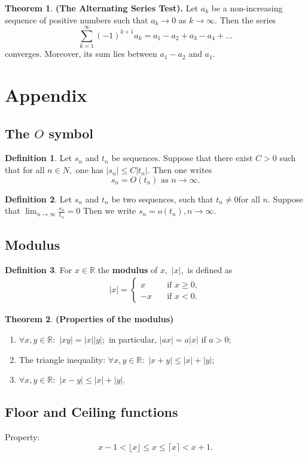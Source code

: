 \documentclass[12pt, a4paper]{article}
\newcommand{\bb}[1]{\mathbb{#1}}
\newcommand{\f}[2]{\frac{#1}{#2}}
\theoremstyle{definition}
\newtheorem{definition}{Definition}[section]
\newtheorem{theorem}{Theorem}[section]
\theoremstyle{plain}
\begin{document}
\begin{theorem}\textbf{(The Alternating Series Test).}
Let $a_k$ be a non-increasing sequence of positive numbers such that $a_k \to 0$ as $k \to \infty$. Then the series $$\sum_{k=1}^{\infty} (-1)^{k+1}a_k =a_1-a_2+a_3-a_4+\ldots$$ converges. Moreover, its sum lies between $a_1-a_2$ and $a_1.$
\end{theorem}

\pagebreak

\section{Appendix}

\subsection{The \texorpdfstring{$O$}{TEXT} symbol}

\begin{definition}
Let $s_n$ and $t_n$ be sequences. Suppose that there exist $C > 0$ such that for all $n \in N,$ one has $|s_n| \leq C|t_n|.$ Then one writes $$s_n=O(t_n) \text{ as } n\to \infty.$$
\end{definition}

\begin{definition}
Let $s_n$ and $t_n$ be two sequences, such that $t_n \neq 0$for all $n.$ Suppose that $\lim_{n\to \infty} \f{s_n}{t_n}=0$  Then we write $s_n =o(t_n),n\to\infty.$
\end{definition}

\subsection{Modulus}

\begin{definition}
For $x\in \bb{R}$ the \textbf{modulus} of $x,$ $|x|,$ is defined as $$\begin{aligned}
|x|=\begin{cases}
x \quad &\text{if $x\geq0,$} \\
-x \quad &\text{if $x<0$.}
\end{cases}
\end{aligned}$$
\end{definition}

\begin{theorem}\textbf{(Properties of the modulus)}
\begin{enumerate}
	
	\item $\forall x,y \in \bb{R}:$ $|xy|=|x||y|;$ in particular, $|ax|=a|x|$ if $a>0;$

	\item The triangle inequality: $\forall x,y \in \bb{R}:$ $|x+y|\leq |x|+|y|;$ 

	\item $\forall x,y \in \bb{R}:$ $|x-y|\leq |x|+|y|.$ 

\end{enumerate}
\end{theorem}

\subsection{Floor and Ceiling functions}

Property: $$x-1< \lfloor x\rfloor \leq x \leq \lceil x\rceil< x+1.$$
\end{document}
